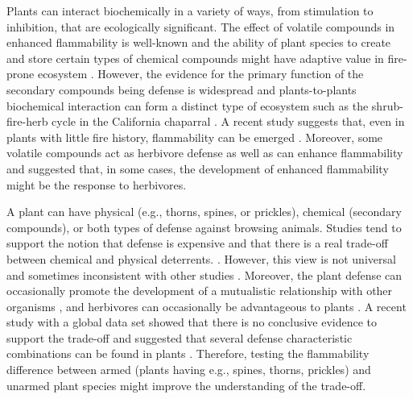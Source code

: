 \documentclass[12pt]{report}
\begin{document}
Plants can interact biochemically in a variety of ways, from stimulation to inhibition, that are ecologically significant\citep{muller1966role}. The effect of volatile compounds in enhanced flammability is well-known \citep{mutch1970wildland,white1994monoterpenes,owens1998seasonal,volatile1,volatile2,volatile3,alam2020shoot,ormeno2009relationship} and the ability of plant species to create and store certain types of chemical compounds might have adaptive value in fire-prone ecosystem \citep{pausas2016secondary}. However, the evidence for the primary function of the secondary compounds being defense is widespread \citep{primaryfunction} and plants-to-plants biochemical interaction can form a distinct type of ecosystem such as the shrub-fire-herb cycle in the California chaparral \citep{allelopathic}. A recent study suggests that, even in plants with little fire history, flammability can be emerged \citep{cui2020shoot}. Moreover, some volatile compounds act as herbivore defense as well as can enhance flammability \citep{white1994monoterpenes} and \citep{owens1998seasonal} suggested that, in some cases, the development of enhanced flammability might be the response to herbivores.

A plant can have physical (e.g., thorns, spines, or prickles), chemical (secondary compounds), or both types of defense against browsing animals. Studies tend to support the notion that defense is expensive and that there is a real trade-off between chemical and physical deterrents. \citep{rhoades1979evolution, van1988defence,twigg1996physicalchemical}. However, this view is not universal and sometimes inconsistent with other studies \citep{iddles2003potentialnegativecorrelation,steward1988theredifferentview,koricheva2004metanegativecorrelation}. Moreover, the plant defense can occasionally promote the development of a mutualistic relationship with other organisms \citep{janzen1966coevolution}, and herbivores can occasionally be advantageous to plants \citep{belsky1986does}. A recent study with a global data set showed that there is no conclusive evidence to support the trade-off and suggested that several defense characteristic combinations can be found in plants \citep{moles2013correlations}. Therefore, testing the flammability difference between armed (plants having e.g., spines, thorns, prickles) and unarmed plant species might improve the understanding of the trade-off.
\end{document}
